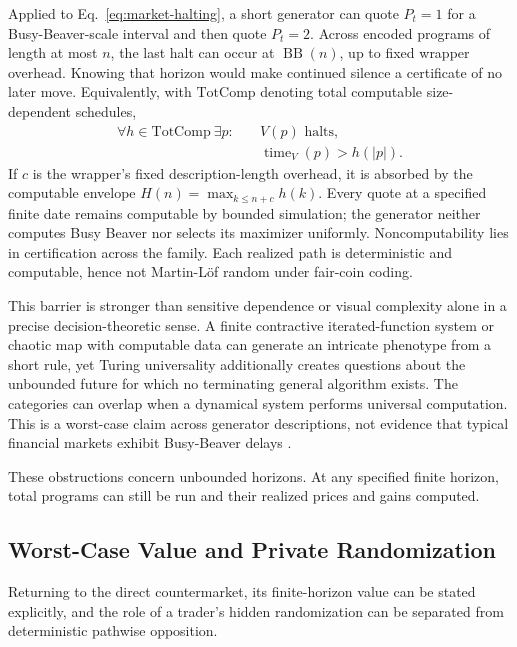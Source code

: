\documentclass[aps,pra,reprint,superscriptaddress,amsmath,amssymb,floatfix]{revtex4-2}
\theoremstyle{plain}
\theoremstyle{definition}
\theoremstyle{remark}
\begin{document}
Applied to Eq.~\eqref{eq:market-halting}, a short generator can quote
\(P_t=1\) for a Busy-Beaver-scale interval and then quote \(P_t=2\). Across
encoded programs of length at most \(n\), the last halt can occur at
\(\operatorname{BB}(n)\), up to fixed wrapper overhead. Knowing that horizon
would make continued silence a certificate of no later move. Equivalently,
with \(\mathrm{TotComp}\) denoting total computable size-dependent schedules,
\begin{equation}
  \begin{aligned}
  \forall h\in\mathrm{TotComp}\ \exists p:\quad
    &V(p)\text{ halts},\\
    &\operatorname{time}_V(p)>h(|p|).
  \end{aligned}
  \label{eq:bb-horizon}
\end{equation}
If \(c\) is the wrapper's fixed description-length overhead, it is absorbed by
the computable envelope \(H(n)=\max_{k\leq n+c}h(k)\). Every quote at a
specified finite date remains
computable by bounded simulation; the generator neither computes Busy Beaver
nor selects its maximizer uniformly. Noncomputability lies in certification
across the family. Each realized path is deterministic and computable, hence
not Martin-L\"of random under fair-coin coding.

This barrier is stronger than sensitive dependence or visual complexity alone
in a precise decision-theoretic sense. A finite contractive iterated-function
system or chaotic map with computable data can generate an intricate phenotype
from a short rule, yet Turing universality additionally creates questions about
the unbounded future for which no terminating general algorithm exists. The
categories can overlap when a dynamical system performs universal computation.
This is a worst-case claim across generator descriptions, not evidence that
typical financial markets exhibit Busy-Beaver delays
\cite{barnsley:88,moore,calude:037103}.

These obstructions concern unbounded horizons. At any specified finite horizon,
total programs can still be run and their realized prices and gains computed.

\subsection{Worst-Case Value and Private Randomization}

Returning to the direct countermarket, its finite-horizon value can be stated
explicitly, and the role of a trader's hidden randomization can be separated
from deterministic pathwise opposition.
\end{document}
